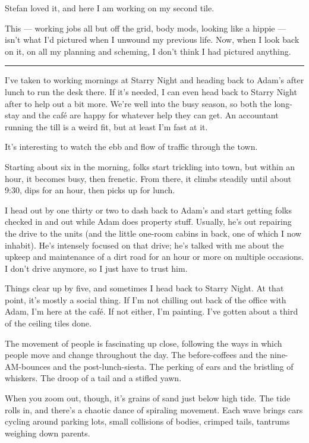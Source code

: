 Stefan loved it, and here I am working on my second tile.

This --- working jobs all but off the grid, body mods, looking like a hippie --- isn't what I'd pictured when I unwound my previous life. Now, when I look back on it, on all my planning and scheming, I don't think I had pictured anything.

\begin{center}\rule{0.5\linewidth}{\linethickness}\end{center}

I've taken to working mornings at Starry Night and heading back to Adam's after lunch to run the desk there. If it's needed, I can even head back to Starry Night after to help out a bit more. We're well into the busy season, so both the long-stay and the café are happy for whatever help they can get. An accountant running the till is a weird fit, but at least I'm fast at it.

It's interesting to watch the ebb and flow of traffic through the town.

Starting about six in the morning, folks start trickling into town, but within an hour, it becomes busy, then frenetic. From there, it climbs steadily until about 9:30, dips for an hour, then picks up for lunch.

I head out by one thirty or two to dash back to Adam's and start getting folks checked in and out while Adam does property stuff. Usually, he's out repairing the drive to the units (and the little one-room cabins in back, one of which I now inhabit). He's intensely focused on that drive; he's talked with me about the upkeep and maintenance of a dirt road for an hour or more on multiple occasions. I don't drive anymore, so I just have to trust him.

Things clear up by five, and sometimes I head back to Starry Night. At that point, it's mostly a social thing. If I'm not chilling out back of the office with Adam, I'm here at the café. If not either, I'm painting. I've gotten about a third of the ceiling tiles done.

The movement of people is fascinating up close, following the ways in which people move and change throughout the day. The before-coffees and the nine-AM-bounces and the post-lunch-siesta. The perking of ears and the bristling of whiskers. The droop of a tail and a stifled yawn.

When you zoom out, though, it's grains of sand just below high tide. The tide rolls in, and there's a chaotic dance of spiraling movement. Each wave brings cars cycling around parking lots, small collisions of bodies, crimped tails, tantrums weighing down parents.

